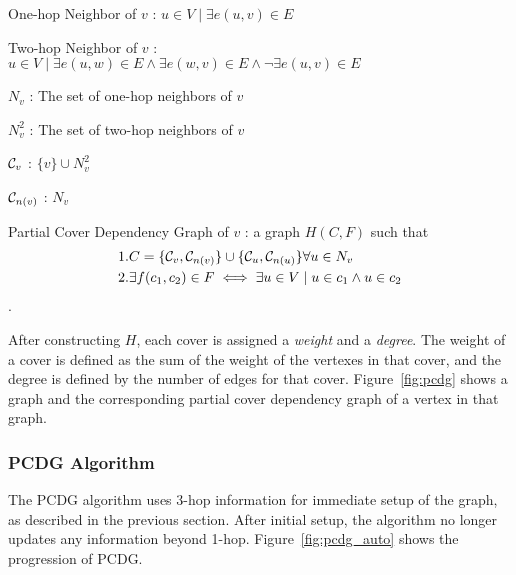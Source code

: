 \begin{defn}
One-hop Neighbor of $v$ : $u \in V \mid \exists e(u,v) \in E$
\end{defn}

\begin{defn}
Two-hop Neighbor of $v$ : $u \in V \mid \exists e(u,w) \in E \land \exists e(w,v) \in E \land \neg\exists e(u,v) \in E$
\end{defn}

\begin{defn}
$N_v$ : The set of one-hop neighbors of $v$
\end{defn}
\begin{defn}
$N_v^2$ : The set of two-hop neighbors of $v$
\end{defn}

\begin{defn}
${\mathcal C}_v$ : $\{v\} \cup N_v^2$
\end{defn}

\begin{defn}
${\mathcal C}_{n(v)}$ : $N_v$
\end{defn} 

\begin{defn}
Partial Cover Dependency Graph of $v$ : a graph $H(C,F)$ such that \begin{align*}& 1. C = \{{\mathcal C}_v, {\mathcal C}_{n(v)}\} \cup \{{\mathcal C}_u, {\mathcal C}_{n(u)}\} \forall u \in N_v\\ & 2. \exists f(c_1, c_2) \in F \iff \exists u \in V \mid u \in c_1 \land u \in c_2\end{align*}.
\end{defn} 

After constructing $H$, each cover is assigned a {\em weight} and a {\em degree}. The weight of a cover is defined as the sum of the weight of the vertexes in that cover, and the degree is defined by the number of edges for that cover. Figure~\ref{fig:pcdg} shows a graph and the corresponding partial cover dependency graph of a vertex in that graph.



\subsubsection{PCDG Algorithm}

The PCDG algorithm uses 3-hop information for immediate setup of the graph, as described in the previous section. After initial setup, the algorithm no longer updates any information beyond 1-hop. Figure~\ref{fig:pcdg_auto} shows the progression of PCDG.


